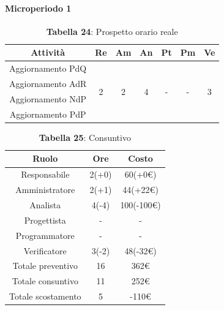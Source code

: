 \paragraph{Microperiodo 1}
\begin{table}[H]
	\centering
	\begin{tabular}{|c|c|c|c|c|c|c|}
		\hline
		\rowcolor{lighter-grayer}
		\textbf{Attività} & \textbf{Re}        & \textbf{Am}        & \textbf{An}        & \textbf{Pt}        & \textbf{Pm}        & \textbf{Ve}        \\ \hline
		Aggiornamento PdQ & \multirow{4}{*}{2} & \multirow{4}{*}{2} & \multirow{4}{*}{4} & \multirow{4}{*}{-} & \multirow{4}{*}{-} & \multirow{4}{*}{3} \\ \cline{1-1}
		Aggiornamento AdR &                    &                    &                    &                    &                    &                    \\ \cline{1-1}
		Aggiornamento NdP &                    &                    &                    &                    &                    &                    \\ \cline{1-1}
		Aggiornamento PdP &                    &                    &                    &                    &                    &                    \\ \hline
	\end{tabular}
	\caption*{\textbf{Tabella 24}: Prospetto orario reale\\}
\end{table}

\begin{table}[H]
	\centering
	\renewcommand{\arraystretch}{1.5}
	\begin{tabular}{|c|c|c|}
		\hline
		\rowcolor{lighter-grayer}
		Ruolo & Ore & Costo \\ \hline
		Responsabile & 2(+0) & 60(+0\euro) \\ \hline
		Amministratore & 2(+1) & 44(+22\euro) \\ \hline
		Analista & 4(-4) & 100(-100\euro) \\ \hline
		Progettista & - & - \\ \hline
		Programmatore & - & - \\ \hline
		Verificatore & 3(-2) & 48(-32\euro) \\ \hline
		Totale preventivo & 16 & 362\euro \\ \hline
		Totale consuntivo & 11 & 252\euro \\ \hline
		Totale scostamento & 5 & -110\euro \\ \hline
	\end{tabular}
	\caption*{\textbf{Tabella 25}: Consuntivo\\}
\end{table}

